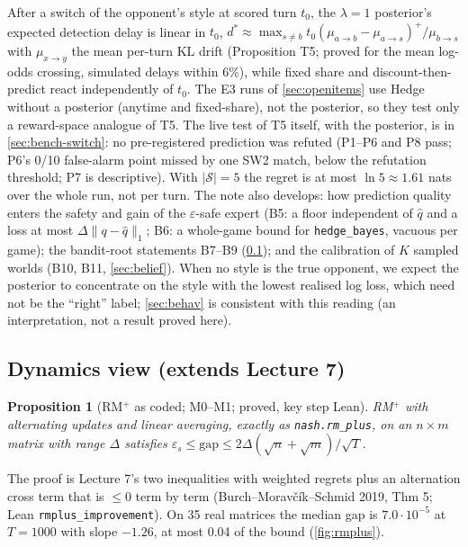 \documentclass[10pt]{article}
\theoremstyle{plain}
\newtheorem{proposition}[theorem]{Proposition}
\theoremstyle{definition}
\theoremstyle{remark}
\newcommand{\epss}{\varepsilon_s}
\newcommand{\qhat}{\hat q}
\begin{document}
After a switch of the opponent's style at scored turn $t_0$, the $\lambda=1$ posterior's expected detection delay is
linear in $t_0$, $d^*\approx\max_{s\ne b}t_0(\mu_{a\to b}-\mu_{a\to s})^+/\mu_{b\to s}$ with $\mu_{x\to y}$ the mean
per-turn KL drift (Proposition T5; proved for the mean log-odds crossing, simulated delays within 6\%), while fixed
share and discount-then-predict react independently of $t_0$. The E3 runs of \cref{sec:openitems} use Hedge without a posterior (anytime and fixed-share), not
the posterior, so they test only a reward-space analogue of T5. The live test of T5 itself, with the posterior, is in
\cref{sec:bench-switch}: no pre-registered prediction was refuted (P1--P6 and P8 pass; P6's 0/10 false-alarm point missed by one SW2 match, below the refutation threshold; P7 is descriptive).
With $|\mathcal S|=5$ the regret is at most $\ln5\approx1.61$ nats over the whole run, not per turn. The note also
develops: how prediction quality enters the safety and gain of the $\varepsilon$-safe expert (B5: a floor independent
of $\qhat$ and a loss at most $\Delta\|q-\qhat\|_1$; B6: a whole-game bound for \texttt{hedge\_bayes}, vacuous per
game); the bandit-root statements B7--B9 (\cref{sec:L7lens}); and the calibration of $K$ sampled worlds (B10, B11,
\cref{sec:belief}). When no style is the true opponent, we expect the posterior to concentrate on the style with the lowest realised log
loss, which need not be the ``right'' label; \cref{sec:behav} is consistent with this reading (an interpretation, not a
result proved here).

\subsection{Dynamics view (extends Lecture 7)}\label{sec:L7lens}

\begin{proposition}[RM$^+$ as coded; M0--M1; proved, key step Lean]\label{prop:rmplus}
RM$^+$ with alternating updates and linear averaging, exactly as \texttt{nash.rm\_plus}, on an $n\times m$ matrix with
range $\Delta$ satisfies $\epss\le\mathrm{gap}\le2\Delta(\sqrt n+\sqrt m)/\sqrt T$.
\end{proposition}
The proof is Lecture 7's two inequalities with weighted regrets plus an alternation cross term that is $\le0$ term by
term (Burch--Morav\v{c}ík--Schmid 2019, Thm 5; Lean \texttt{rmplus\_improvement}). On 35 real matrices the median gap is
$7.0\cdot10^{-5}$ at $T=1000$ with slope $-1.26$, at most 0.04 of the bound (\cref{fig:rmplus}).
\end{document}
